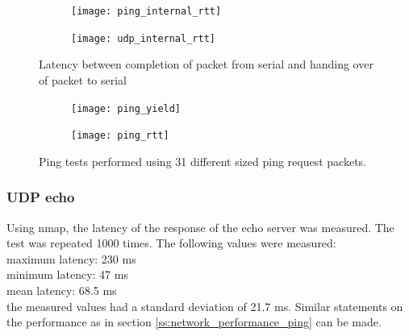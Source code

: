 \begin{figure}
	\begin{subfigure}[c]{0.50\textwidth}
	\centering
		\texttt{[image: ping\_internal\_rtt]}
	\end{subfigure}
\begin{subfigure}[c]{0.50\textwidth}
\centering
		\texttt{[image: udp\_internal\_rtt]}
	\end{subfigure}
	\caption{Latency between completion of packet from serial and handing over of packet to serial}
	\label{f:internal_rtt_figure}
\end{figure}

\begin{figure}
	\begin{subfigure}[c]{0.50\textwidth}
	\centering
		\texttt{[image: ping\_yield]}
	\end{subfigure}
\begin{subfigure}[c]{0.50\textwidth}
\centering
		\texttt{[image: ping\_rtt]}
	\end{subfigure}
	\caption{Ping tests performed using 31 different sized ping request packets.}
	\label{f:ping_figure}
\end{figure}

\subsubsection{UDP echo}
Using nmap, the latency of the response of the echo server was measured. The test was repeated 1000 times. The following values were measured:\\
maximum latency: 230 ms\\
minimum latency: 47 ms\\
mean latency: 68.5 ms\\
the measured values had a standard deviation of 21.7 ms.
Similar statements on the performance as in section \ref{ss:network_performance_ping} can be made.


